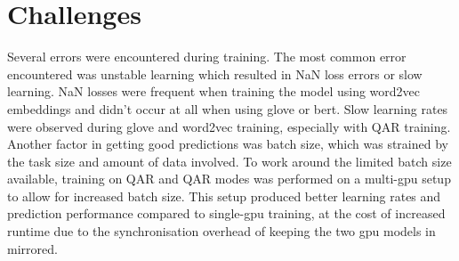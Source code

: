 

\section{Challenges}
\label{sec:experiment-challenges}

Several errors were encountered during training.
The most common error encountered was unstable learning which resulted in NaN loss errors or slow learning.
NaN losses were frequent when training the model using word2vec embeddings and didn't occur at all when using glove or bert.
Slow learning rates were observed during glove and word2vec training, especially with Q\rightarrow{}AR training.
Another factor in getting good predictions was batch size, which was strained by the task size and amount of data involved.
To work around the limited batch size available, training on QA\rightarrow{}R and Q\rightarrow{}AR modes was performed on a multi-gpu setup to allow for increased batch size.
This setup produced better learning rates and prediction performance compared to single-gpu training, at the cost of increased runtime due to the synchronisation overhead of keeping the two gpu models in mirrored.
